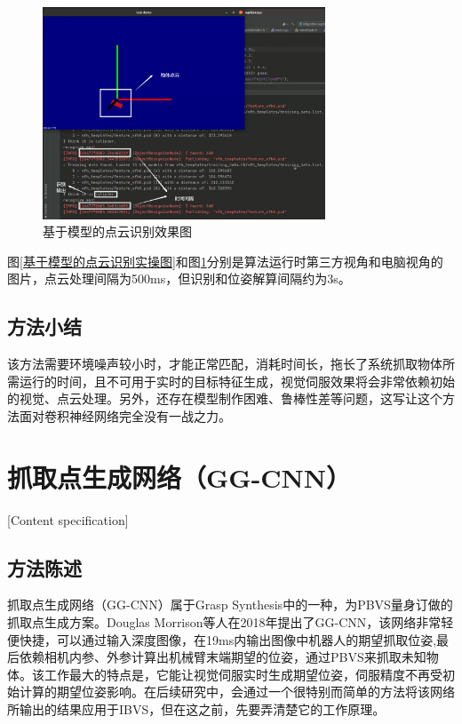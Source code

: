 \documentclass[fontset=fandol,type=bachelor,campus=harbin]{hithesisbook}
\begin{document}
\begin{figure}[h]
\centering
\includegraphics[width = 0.75\textwidth]{chapter3/基于模型的点云识别效果图}
\caption{基于模型的点云识别效果图}
\label{基于模型的点云识别效果图}
\end{figure}


图\ref{基于模型的点云识别实操图}和图\ref{基于模型的点云识别效果图}分别是算法运行时第三方视角和电脑视角的图片，点云处理间隔为500ms，但识别和位姿解算间隔约为3s。

\subsection{方法小结}
该方法需要环境噪声较小时，才能正常匹配，消耗时间长，拖长了系统抓取物体所需运行的时间，且不可用于实时的目标特征生成，视觉伺服效果将会非常依赖初始的视觉、点云处理。另外，还存在模型制作困难、鲁棒性差等问题，这写让这个方法面对卷积神经网络完全没有一战之力。


\section{抓取点生成网络（GG-CNN）}[Content specification]
\subsection{方法陈述}
抓取点生成网络（GG-CNN）属于Grasp Synthesis中的一种，为PBVS量身订做的抓取点生成方案。Douglas Morrison等人在2018年提出了GG-CNN，该网络非常轻便快捷，可以通过输入深度图像，在19ms内输出图像中机器人的期望抓取位姿,最后依赖相机内参、外参计算出机械臂末端期望的位姿，通过PBVS来抓取未知物体\cite{morrison2018closing}。该工作最大的特点是，它能让视觉伺服实时生成期望位姿，伺服精度不再受初始计算的期望位姿影响。在后续研究中，会通过一个很特别而简单的方法将该网络所输出的结果应用于IBVS，但在这之前，先要弄清楚它的工作原理。
\end{document}
